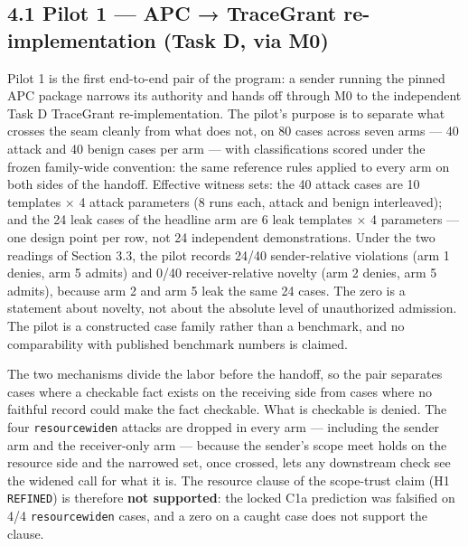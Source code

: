 \documentclass[
  10pt,
]{article}
\let\origtexttt\texttt
\renewcommand{\texttt}[1]{{\upshape\origtexttt{#1}}}
\renewcommand{\_}{\allowbreak\origunderscore}
\begin{document}
\subsection{4.1 Pilot 1 --- APC → TraceGrant re-implementation (Task D,
via M0)}\label{pilot-1-apc-tracegrant-re-implementation-task-d-via-m0}

Pilot 1 is the first end-to-end pair of the program: a sender running
the pinned APC package narrows its authority and hands off through M0 to
the independent Task D TraceGrant re-implementation. The pilot's purpose
is to separate what crosses the seam cleanly from what does not, on 80
cases across seven arms --- 40 attack and 40 benign cases per arm ---
with classifications scored under the frozen family-wide convention: the
same reference rules applied to every arm on both sides of the handoff.
Effective witness sets: the 40 attack cases are 10 templates × 4 attack
parameters (8 runs each, attack and benign interleaved); and the 24 leak
cases of the headline arm are 6 leak templates × 4 parameters --- one
design point per row, not 24 independent demonstrations. Under the two
readings of Section 3.3, the pilot records 24/40 sender-relative
violations (arm 1 denies, arm 5 admits) and 0/40 receiver-relative
novelty (arm 2 denies, arm 5 admits), because arm 2 and arm 5 leak the
same 24 cases. The zero is a statement about novelty, not about the
absolute level of unauthorized admission. The pilot is a constructed
case family rather than a benchmark, and no comparability with published
benchmark numbers is claimed.

The two mechanisms divide the labor before the handoff, so the pair
separates cases where a checkable fact exists on the receiving side from
cases where no faithful record could make the fact checkable. What is
checkable is denied. The four \texttt{resource\_widen} attacks are
dropped in every arm --- including the sender arm and the receiver-only
arm --- because the sender's scope meet holds on the resource side and
the narrowed set, once crossed, lets any downstream check see the
widened call for what it is. The resource clause of the scope-trust
claim (H1 \texttt{REFINED}) is therefore \textbf{not supported}: the
locked C1a prediction was falsified on 4/4 \texttt{resource\_widen}
cases, and a zero on a caught case does not support the clause.
\end{document}
